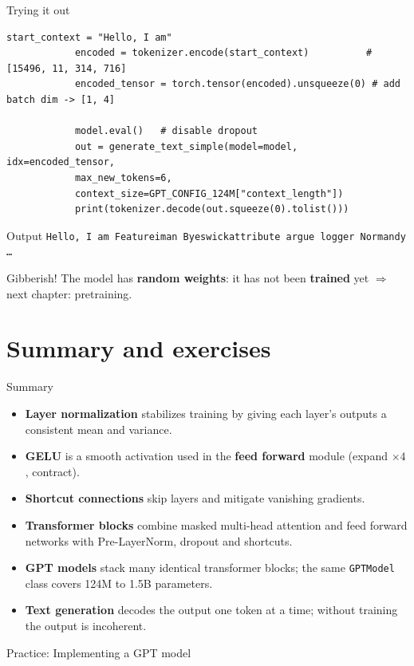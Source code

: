 \documentclass[aspectratio=169]{beamer}
\begin{document}
	\begin{frame}[fragile]{Trying it out}
		\begin{lstlisting}[basicstyle=\ttfamily\tiny]
			start_context = "Hello, I am"
			encoded = tokenizer.encode(start_context)          # [15496, 11, 314, 716]
			encoded_tensor = torch.tensor(encoded).unsqueeze(0) # add batch dim -> [1, 4]
			
			model.eval()   # disable dropout
			out = generate_text_simple(model=model, idx=encoded_tensor,
			max_new_tokens=6,
			context_size=GPT_CONFIG_124M["context_length"])
			print(tokenizer.decode(out.squeeze(0).tolist()))
		\end{lstlisting}
		\begin{alertblock}{Output}
			\small \texttt{Hello, I am Featureiman Byeswickattribute argue logger Normandy \dots}
		\end{alertblock}
		\small Gibberish! The model has \textbf{random weights}: it has not been \textbf{trained} yet $\Rightarrow$ next chapter: pretraining.
	\end{frame}
	
	\section{Summary and exercises}
	
	\begin{frame}{Summary}
		\begin{itemize}
			\small
			\item \textbf{Layer normalization} stabilizes training by giving each layer's outputs a consistent mean and variance.
			\item \textbf{GELU} is a smooth activation used in the \textbf{feed forward} module (expand $\times4$, contract).
			\item \textbf{Shortcut connections} skip layers and mitigate vanishing gradients.
			\item \textbf{Transformer blocks} combine masked multi-head attention and feed forward networks with Pre-LayerNorm, dropout and shortcuts.
			\item \textbf{GPT models} stack many identical transformer blocks; the same \texttt{GPTModel} class covers 124M to 1.5B parameters.
			\item \textbf{Text generation} decodes the output one token at a time; without training the output is incoherent.
		\end{itemize}
	\end{frame}
	
	
	\begin{frame}[standout]
		Practice: Implementing a GPT model
	\end{frame}
	
\end{document}

